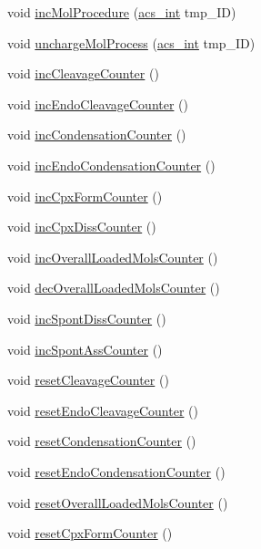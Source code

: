\begin{DoxyCompactItemize}
void \hyperlink{a00003_a094499a0f1bb3c2342a3b16944f5280d}{inc\-Mol\-Procedure} (\hyperlink{a00016_a8d277355641a098190360234e2ebde35}{acs\-\_\-int} tmp\-\_\-\-I\-D)
\item 
void \hyperlink{a00003_af21c066ce18c8a39740f66a995782fb9}{uncharge\-Mol\-Process} (\hyperlink{a00016_a8d277355641a098190360234e2ebde35}{acs\-\_\-int} tmp\-\_\-\-I\-D)
\item 
void \hyperlink{a00003_a480887ed06f63d34e014c19ea302d3d5}{inc\-Cleavage\-Counter} ()
\item 
void \hyperlink{a00003_ab0fc2cd6ed209d61286b837bd5460d90}{inc\-Endo\-Cleavage\-Counter} ()
\item 
void \hyperlink{a00003_a3fae8e57fad9ef5b182e32d9bb9989af}{inc\-Condensation\-Counter} ()
\item 
void \hyperlink{a00003_a01812d540519696ab07c9f822119cc64}{inc\-Endo\-Condensation\-Counter} ()
\item 
void \hyperlink{a00003_afd3d590aa9b6a644cb360cc5fd47e16a}{inc\-Cpx\-Form\-Counter} ()
\item 
void \hyperlink{a00003_a73f88a08ff9206e48063cccb1729ee6b}{inc\-Cpx\-Diss\-Counter} ()
\item 
void \hyperlink{a00003_a719b14624d9a2f891b8d4eb47649a00e}{inc\-Overall\-Loaded\-Mols\-Counter} ()
\item 
void \hyperlink{a00003_a6686b0489ed94f11c4b03c011978f9af}{dec\-Overall\-Loaded\-Mols\-Counter} ()
\item 
void \hyperlink{a00003_a0c22436405fc1ec79d33485c2e80d817}{inc\-Spont\-Diss\-Counter} ()
\item 
void \hyperlink{a00003_aa2632ded9c384c3183c3ebebb530e2d7}{inc\-Spont\-Ass\-Counter} ()
\item 
void \hyperlink{a00003_a0b1e324c651c86cb54279e022c14dc6d}{reset\-Cleavage\-Counter} ()
\item 
void \hyperlink{a00003_a3362d147de095640619d9b44f7f20bba}{reset\-Endo\-Cleavage\-Counter} ()
\item 
void \hyperlink{a00003_ac7deab8db2f581077da735c3542d8f1b}{reset\-Condensation\-Counter} ()
\item 
void \hyperlink{a00003_a55cff0bc2f8de4d3e4db471cad580a86}{reset\-Endo\-Condensation\-Counter} ()
\item 
void \hyperlink{a00003_abc04de785dddab4703fdcf52ccdf85f9}{reset\-Overall\-Loaded\-Mols\-Counter} ()
\item 
void \hyperlink{a00003_a4cf4413f3028f8c5e33991ad5ba18e21}{reset\-Cpx\-Form\-Counter} ()
\item 

\end{DoxyCompactItemize}
